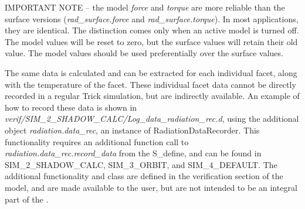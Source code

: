 IMPORTANT NOTE -- the model \textit{force} and \textit{torque} are more reliable than the surface versions (\textit{rad\_surface.force} and \textit{rad\_surface.torque}).  In most applications, they are identical.  The distinction comes only when an active model is turned off.  The model values will be reset to zero, but the surface values will retain their old value.  The model values should be used preferentially over the surface values.

The same data is calculated and can be extracted for each individual facet,
along with the temperature of the facet.  These individual facet data cannot be
directly recorded in a regular Trick simulation, but are indirectly available.
An example of how to record these data is shown in
\textit{verif/SIM\_2\_SHADOW\_CALC/Log\_data\_radiation\_rec.d}, using the
additional object \textit{radiation.data\_rec}, an instance of
RadiationDataRecorder.  This functionality requires an additional function call
to \textit{radiation.data\_rec.record\_data} from the S\_define, and can be found in SIM\_2\_SHADOW\_CALC, SIM\_3\_ORBIT, and SIM\_4\_DEFAULT.
The additional functionality and class are defined in the verification section
of the model, and are made available to the user, but are not intended to be an
integral part of the \RadiationPressureDesc.
